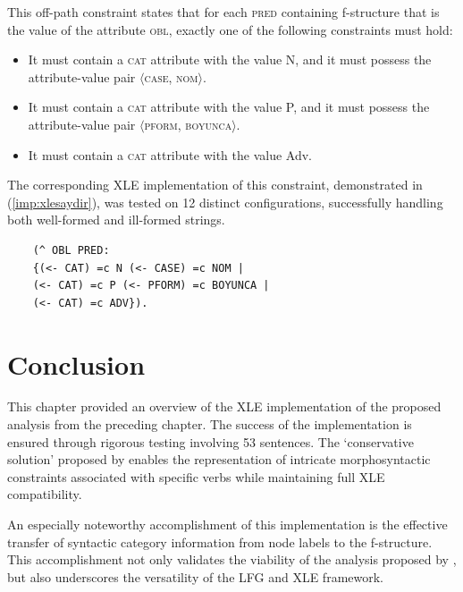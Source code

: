 This off-path constraint states that for each \textsc{pred} containing f-structure that is the value of the attribute \textsc{obl}, exactly one of the following constraints must hold:

\begin{itemize}
	\item It must contain a \textsc{cat} attribute with the value N, and it must possess the attribute-value pair $\langle$\textsc{case, nom}$\rangle$.
	\item It must contain a \textsc{cat} attribute with the value P, and it must possess the attribute-value pair $\langle$\textsc{pform, boyunca}$\rangle$.
	\item It must contain a \textsc{cat} attribute with the value Adv.
\end{itemize}

The corresponding XLE implementation of this constraint, demonstrated in (\ref{imp:xlesaydir}), was tested on 12 distinct configurations, successfully handling both well-formed and ill-formed strings.

\pex
\label{imp:xlesur}
\vspace{-20pt}

\begin{lstlisting}
    (^ OBL PRED: 
    {(<- CAT) =c N (<- CASE) =c NOM | 
    (<- CAT) =c P (<- PFORM) =c BOYUNCA |
    (<- CAT) =c ADV}).
\end{lstlisting}
\xe

\section{Conclusion}

This chapter provided an overview of the XLE implementation of the proposed analysis from the preceding chapter. The success of the implementation is ensured through rigorous testing involving 53 sentences. The `conservative solution' proposed by \citeauthor{prz:pat:21:oup} enables the representation of intricate morphosyntactic constraints associated with specific verbs while maintaining full XLE compatibility.

\begin{sloppypar}
An especially noteworthy accomplishment of this implementation is the effective transfer of syntactic category information from node labels to the f-structure. This accomplishment not only validates the viability of the analysis proposed by \citeauthor{prz:pat:21:oup}, but also underscores the versatility of the LFG and XLE framework. 
\end{sloppypar}